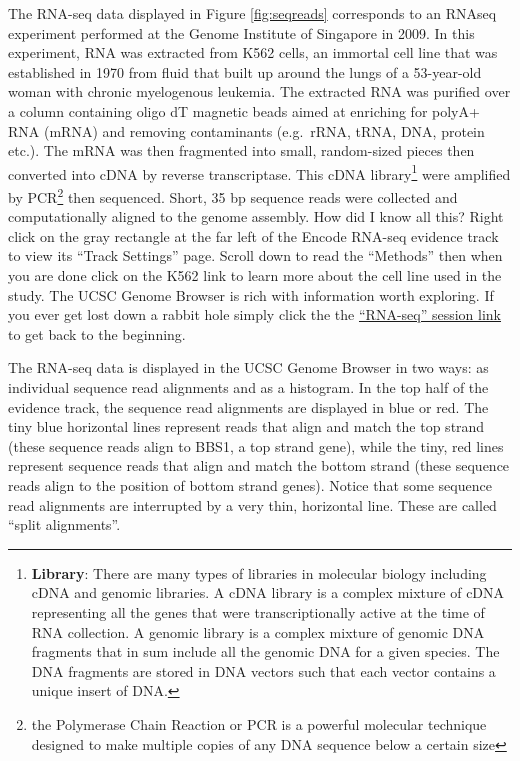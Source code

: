 \documentclass[
]{book}
\begin{document}
The RNA-seq data displayed in Figure \ref{fig:seqreads} corresponds to an RNAseq experiment performed at the Genome Institute of Singapore in 2009. In this experiment, RNA was extracted from K562 cells, an immortal cell line that was established in 1970 from fluid that built up around the lungs of a 53-year-old woman with chronic myelogenous leukemia. The extracted RNA was purified over a column containing oligo dT magnetic beads aimed at enriching for polyA+ RNA (mRNA) and removing contaminants (e.g.~rRNA, tRNA, DNA, protein etc.). The mRNA was then fragmented into small, random-sized pieces then converted into cDNA by reverse transcriptase. This cDNA library\footnote{\textbf{Library}: There are many types of libraries in molecular biology including cDNA and genomic libraries. A cDNA library is a complex mixture of cDNA representing all the genes that were transcriptionally active at the time of RNA collection. A genomic library is a complex mixture of genomic DNA fragments that in sum include all the genomic DNA for a given species. The DNA fragments are stored in DNA vectors such that each vector contains a unique insert of DNA.} were amplified by PCR\footnote{the Polymerase Chain Reaction or PCR is a powerful molecular technique designed to make multiple copies of any DNA sequence below a certain size} then sequenced. Short, 35 bp sequence reads were collected and computationally aligned to the genome assembly. How did I know all this? Right click on the gray rectangle at the far left of the Encode RNA-seq evidence track to view its ``Track Settings'' page. Scroll down to read the ``Methods'' then when you are done click on the K562 link to learn more about the cell line used in the study. The UCSC Genome Browser is rich with information worth exploring. If you ever get lost down a rabbit hole simply click the the \href{https://genome.ucsc.edu/s/megallegos/Biol\%20310\%3A\%20Module\%202\%20RNA\%2Dseq}{``RNA-seq'' session link} to get back to the beginning.

The RNA-seq data is displayed in the UCSC Genome Browser in two ways: as individual sequence read alignments and as a histogram. In the top half of the evidence track, the sequence read alignments are displayed in blue or red. The tiny blue horizontal lines represent reads that align and match the top strand (these sequence reads align to BBS1, a top strand gene), while the tiny, red lines represent sequence reads that align and match the bottom strand (these sequence reads align to the position of bottom strand genes). Notice that some sequence read alignments are interrupted by a very thin, horizontal line. These are called ``split alignments''.
\end{document}
